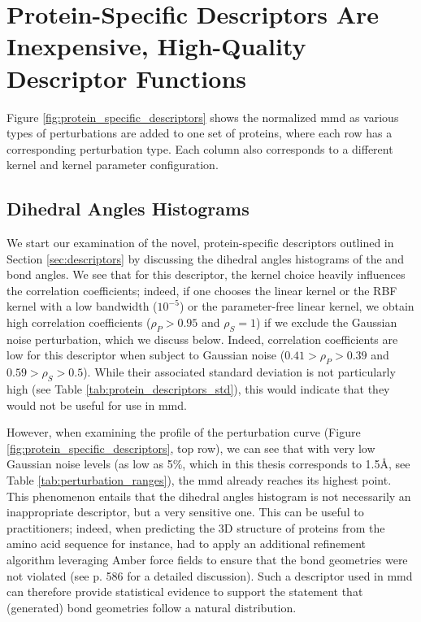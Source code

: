\section{Protein-Specific Descriptors Are Inexpensive, High-Quality Descriptor
Functions}\label{sec:results_protein_descriptors}

Figure \ref{fig:protein_specific_descriptors} shows the normalized \gls{mmd} as
various types of perturbations are added to one set of proteins, where each row
has a corresponding perturbation type. Each column also corresponds to a
different kernel and kernel parameter configuration.

\subsection{Dihedral Angles Histograms}\label{sec:res_dihedral_angles}
We start our examination of the novel, protein-specific descriptors outlined in
Section \ref{sec:descriptors} by discussing the dihedral angles histograms of
the \textphi{} and \textpsi{} bond angles. We see that for this descriptor, the
kernel choice heavily influences the correlation coefficients; indeed, if one
chooses the linear kernel or the RBF kernel with a low bandwidth ($10^{-5}$) or
the parameter-free linear kernel, we obtain high correlation coefficients
($\rho_P>0.95$ and $\rho_S=1$) if we exclude the Gaussian noise perturbation,
which we discuss below. Indeed, correlation coefficients are low for this
descriptor when subject to Gaussian noise ($0.41>\rho_P>0.39$ and
$0.59>\rho_S>0.5$). While their associated standard deviation is not
particularly high (see Table \ref{tab:protein_descriptors_std}), this would
indicate that they would not be useful for use in \gls{mmd}.

However, when examining the profile of the perturbation curve (Figure
\ref{fig:protein_specific_descriptors}, top row), we can see that with very low
Gaussian noise levels (as low as 5\%, which in this thesis corresponds to
1.5\si{\angstrom}, see Table \ref{tab:perturbation_ranges}), the \gls{mmd} already
reaches its highest point. This phenomenon entails that the dihedral angles
histogram is not necessarily an inappropriate descriptor, but a very sensitive
one. This can be useful to practitioners; indeed, when predicting the 3D
structure of proteins from the amino acid sequence for instance,
\cite{jumper2021highly} had to apply an additional refinement algorithm
leveraging Amber force fields \citep{hornak2006comparison} to ensure that the
bond geometries were not violated (see \citep{jumper2021highly} p. 586 for a
detailed discussion). Such a descriptor used in \gls{mmd} can therefore provide
statistical evidence to support the statement that (generated) bond geometries
follow a natural distribution.


